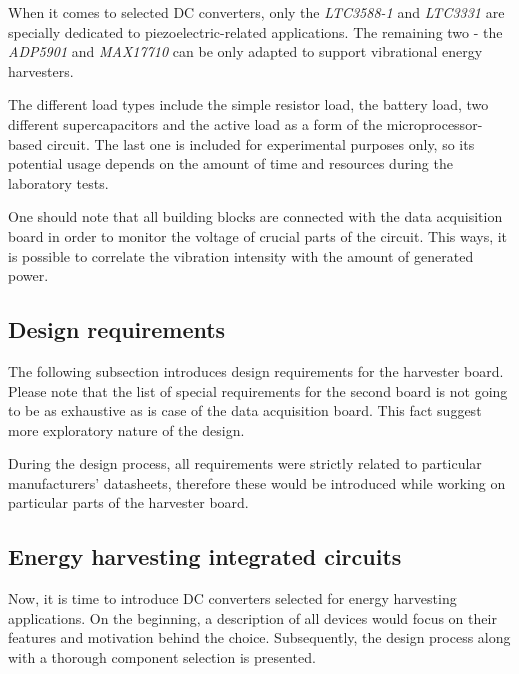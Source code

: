 \documentclass[12pt,a4paper]{article}
\begin{document}
When it comes to selected DC converters, only the \textit{LTC3588-1} and \textit{LTC3331} are specially dedicated to piezoelectric-related applications. The remaining two - the \textit{ADP5901} and \textit{MAX17710} can be only adapted to support vibrational energy harvesters.
\par
The different load types include the simple resistor load, the battery load, two different supercapacitors and the active load as a form of the microprocessor-based circuit. The last one is included for experimental purposes only, so its potential usage depends on the amount of time and resources during the laboratory tests.
\par
One should note that all building blocks are connected with the data acquisition board in order to monitor the voltage of crucial parts of the circuit. This ways, it is possible to correlate the vibration intensity with the amount of generated power.


\subsection{Design requirements}
The following subsection introduces design requirements for the harvester board. Please note that the list of special requirements for the second board is not going to be as exhaustive as is case of the data acquisition board. This fact suggest more exploratory nature of the design.\par
During the design process, all requirements were strictly related to particular manufacturers' datasheets, therefore these would be introduced while working on particular parts of the harvester board.


\subsection{Energy harvesting integrated circuits}

Now, it is time to introduce DC converters selected for energy harvesting applications. On the beginning, a description of all devices would focus on their features and motivation behind the choice. Subsequently, the design process along with a thorough component selection is presented.
\end{document}
